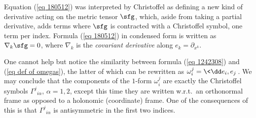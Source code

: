 \begin{rem}
    Equation (\ref{eq 180512}) was interpreted by Christoffel as defining a new kind of derivative acting on the metric tensor $\sfg$, which, aside from taking a partial derivative, adds terms where $\sfg$ is contracted with a Christoffel symbol, one term per index. Formula (\ref{eq 180512}) in condensed form is written as $\nabla_k \sfg=0$, where $\nabla_k$ is the \emph{covariant derivative} along $e_k=\partial_{x^k}$.

    One cannot help but notice the similarity between formula (\ref{eq 1242308}) and (\ref{eq def of omegas}), the latter of which can be rewritten as $\omega^j_i=\<\dd e_i,e_j\>$. We may conclude that the components of the $1$-form $\omega^j_i$ are exactly the Christoffel symbols $\Gamma^j{}_{i\alpha}$, $\alpha=1,2$, except this time they are written w.r.t.\ an orthonormal frame as opposed to a holonomic (coordinate) frame. One of the consequences of this is that $\Gamma^j{}_{i\alpha}$ is antisymmetric in the first two indices.
    

\end{rem}

